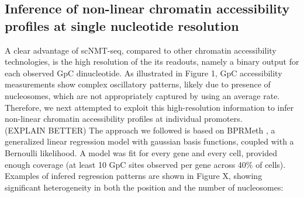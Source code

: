 
\subsection{Inference of non-linear chromatin accessibility profiles at single nucleotide resolution}
A clear advantage of scNMT-seq, compared to other chromatin accessibility technologies, is the high resolution of the its readouts, namely a binary output for each observed GpC dinucleotide. As illustrated in Figure 1, GpC accessibility measurements show complex oscillatory patterns, likely due to presence of nucleosomes, which are not appropriately captured by using an average rate. Therefore, we next attempted to exploit this high-resolution information to infer non-linear chromatin accessibility profiles at individual promoters.\\
(EXPLAIN BETTER) The approach we followed is based on BPRMeth \cite{Kapourani2018}, a generalized linear regression model with gaussian basis functions, coupled with a Bernoulli likelihood. A model was fit for every gene and every cell, provided enough coverage (at least 10 GpC sites observed per gene across 40\% of cells).\\
 Examples of infered regression patterns are shown in Figure X, showing significant heterogeneity in both the position and the number of nucleosomes:

